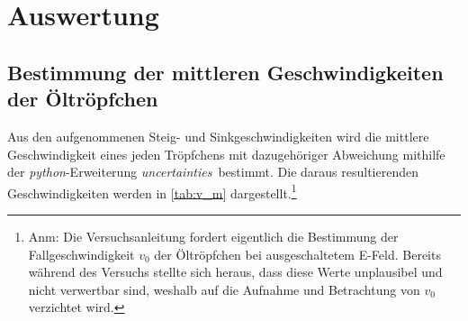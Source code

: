 \section{Auswertung}
\label{sec:Auswertung}
\subsection{Bestimmung der mittleren Geschwindigkeiten der Öltröpfchen}
Aus den aufgenommenen Steig- und Sinkgeschwindigkeiten wird die mittlere Geschwindigkeit eines jeden Tröpfchens
mit dazugehöriger Abweichung mithilfe der \textit{python}-Erweiterung \textit{uncertainties}\,\cite{uncertainties}
bestimmt. Die daraus resultierenden Geschwindigkeiten werden in \autoref{tab:v_m} dargestellt.\footnote{Anm: Die 
Versuchsanleitung fordert eigentlich die Bestimmung der Fallgeschwindigkeit $v_0$ der Öltröpfchen bei ausgeschaltetem
E-Feld. Bereits während des Versuchs stellte sich heraus, dass diese Werte unplausibel und nicht verwertbar sind, 
weshalb auf die Aufnahme und Betrachtung von $v_0$ verzichtet wird.}

